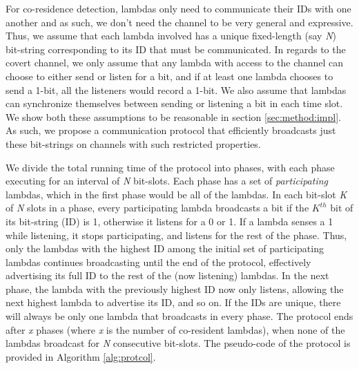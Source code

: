 For co-residence detection, lambdas only need to communicate their IDs with one another
and as such, we don't need the channel to be very general and expressive. 
Thus, we assume that each lambda involved has a unique fixed-length (say \emph{N}) 
bit-string corresponding to its ID that must be communicated.  
In regards to the covert channel, we only assume that any lambda with access to the 
channel can choose to either send or listen for a bit, and if at least one lambda 
chooses to send a 1-bit, all the listeners would record a 1-bit. 
We also assume that lambdas can synchronize themselves between sending or listening 
a bit in each time slot. We show both these assumptions to be reasonable in 
section \ref{sec:method:impl}. 
As such, we propose a communication protocol that efficiently broadcasts 
just these bit-strings on channels with such restricted properties.

We divide the total running time of the protocol into phases, with each phase executing for an
interval of \textit{N} bit-slots. Each phase has a set of \textit{participating}
lambdas, which in the first phase would be all of the lambdas. In
each bit-slot \textit{K} of \textit{N} slots in a phase, every participating
lambda broadcasts a bit if the $K^{th}$ bit of its bit-string (ID) is 1,
otherwise it listens for a 0 or 1. If a lambda senses a 1 while listening, it
stops participating, and listens for the rest of the phase. Thus, only the
lambdas with the highest ID among the initial set of participating lambdas
continues broadcasting until the end of the protocol, effectively advertising
its full ID to the rest of the (now listening) lambdas. In the next phase, the
lambda with the previously highest ID now only listens, allowing the next
highest lambda to advertise its ID, and so on.  If the IDs are unique,
there will always be only one lambda that broadcasts in every phase. The
protocol ends after \textit{x} phases (where \textit{x} is the number of co-resident
lambdas), when none of the lambdas broadcast for \textit{N} consecutive
bit-slots. The pseudo-code of the protocol is provided in Algorithm
\ref{alg:protcol}. 

